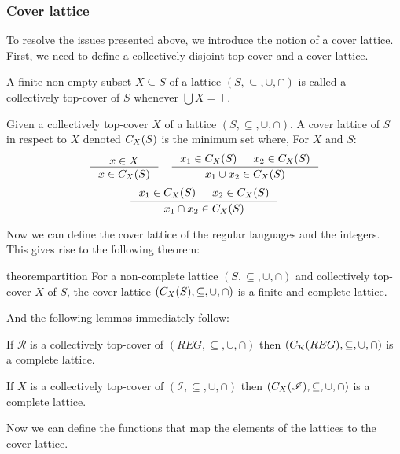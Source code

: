 \subsubsection{Cover lattice}
To resolve the issues presented above, we introduce the notion of a cover lattice.
First, we need to define a collectively disjoint top-cover and a cover lattice.

\begin{definition}
    A finite non-empty subset $X \subseteq S$ of a lattice $(S, \subseteq, \cup, \cap)$ is called a collectively top-cover of $S$ whenever $\bigcup X = \top$.
\end{definition}

\begin{definition}\label{def:coverlattice}
Given a collectively top-cover $X$ of a lattice $(S, \subseteq, \cup, \cap)$.
A cover lattice of $S$ in respect to $X$ denoted $C_{X}(S)$ is the minimum set where,
For $X$ and $S$:
\[
    \inference{x \in X}{x \in C_X(S)} \quad
    \inference{x_1 \in C_X(S) & x_2 \in C_X(S)}{x_1 \cup  x_2 \in C_X(S)}
\]
\[
    \inference{x_1 \in C_X(S) & x_2 \in C_X(S)}{x_1 \cap  x_2 \in C_X(S)}
\]
\end{definition}

Now we can define the cover lattice of the regular languages and the integers.
This gives rise to the following theorem:

\begin{restatable}{theorem}{partition}\label{thm:partition}
For a non-complete lattice $(S, \subseteq, \cup, \cap)$ and collectively top-cover $X$ of $S$, the cover lattice $(C_{X}(S), \subseteq, \cup, \cap)$ is a finite and complete lattice.
\end{restatable}

And the following lemmas immediately follow:

\begin{lemma}
    If $\mathcal{R}$ is a collectively top-cover of $(REG, \subseteq, \cup, \cap)$ then $(C_{\mathcal{R}}(REG), \subseteq, \cup, \cap)$ is a complete lattice.
\end{lemma}

\begin{lemma}
    If $X$ is a collectively top-cover of $(\mathscr{I}, \subseteq, \cup, \cap)$ then $(C_{X}(\mathscr{I}), \subseteq, \cup, \cap)$ is a complete lattice.
\end{lemma}

Now we can define the functions that map the elements of the lattices to the cover lattice.

